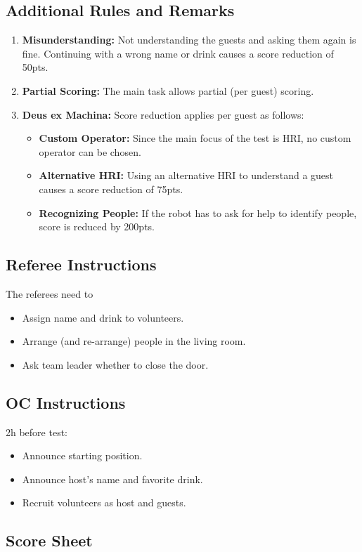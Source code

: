 \subsection*{Additional Rules and Remarks}
\begin{enumerate}[nosep]
	\item \textbf{Misunderstanding:} Not understanding the guests and asking them again is fine. Continuing with a wrong name or drink causes a score reduction of 50pts.
		
	\item \textbf{Partial Scoring:} The main task allows partial (per guest) scoring.
	
	\item \textbf{Deus ex Machina:} Score reduction applies per guest as follows:
	\begin{itemize}[nosep]
		\item \textbf{Custom Operator:} Since the main focus of the test is HRI, no custom operator can be chosen.
		\item \textbf{Alternative HRI:} Using an alternative HRI to understand a guest causes a score reduction of 75pts.
		\item \textbf{Recognizing People:} If the robot has to ask for help to identify people, score is reduced by 200pts. 
	\end{itemize}
\end{enumerate}

\newpage

\subsection*{Referee Instructions}

The referees need to
\begin{itemize}
	\item Assign name and drink to volunteers.
	\item Arrange (and re-arrange) people in the living room.
	\item Ask team leader whether to close the door.
\end{itemize}

\subsection*{OC Instructions}

2h before test:
\begin{itemize}
	\item Announce starting position.
	\item Announce host's name and favorite drink.
	\item Recruit volunteers as host and guests.
\end{itemize}

\subsection*{Score Sheet}

